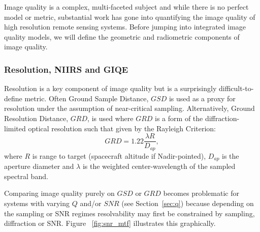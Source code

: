 \documentclass[]{spieman}  %
\begin{document}
Image quality is a complex, multi-faceted subject and while there is no perfect model or metric, substantial work has gone into quantifying the image quality of high resolution remote sensing systems.  Before jumping into integrated image quality models, we will define the geometric and radiometric components of image quality.

\subsubsection{Resolution, NIIRS and GIQE}
Resolution is a key component of image quality but is a surprisingly difficult-to-define metric.  Often Ground Sample Distance, $GSD$ is used as a proxy for resolution under the assumption of near-critical sampling.
Alternatively, Ground Resolution Distance, $GRD$, is used where $GRD$ is a form of the diffraction-limited optical resolution such that given by the Rayleigh Criterion:
\begin{equation}
    GRD = 1.22 \frac{\lambda R}{D_{ap}},
\end{equation}
where $R$ is range to target (spacecraft altitude if Nadir-pointed),  $D_{ap}$ is the aperture diameter and $\lambda$ is the weighted center-wavelength of the sampled spectral band.

Comparing image quality purely on $GSD$ or $GRD$ becomes problematic for systems with varying $Q$ and/or $SNR$ (see Section~\ref{sec:q}) because depending on the sampling or SNR regimes resolvability may first be constrained by sampling, diffraction or SNR.  Figure ~\ref{fig:snr_mtf} illustrates this graphically.
\end{document}
